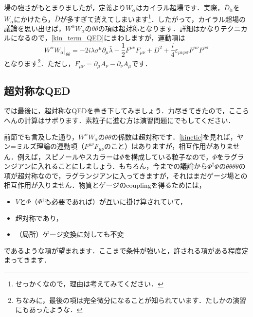 \documentclass[a4paper,uplatex,dvipdfmx]{jsarticle}
\theoremstyle{definition}
\begin{document}
場の強さがもとまりましたが，定義より$W_{\alpha}$はカイラル超場です．実際，$\bar{D}_{\dot{\alpha}}$を$W_{\alpha}$にかけたら，$\bar{D}$が多すぎて消えてしまいます\footnote{せっかくなので，理由は考えてみてください．}．したがって，カイラル超場の議論を思い出せば，$W^{\alpha}W_{\alpha}$の$\theta\theta$の項は超対称となります．詳細はかなりテクニカルになるので，\ref{kin_term_QED}にまわしますが，運動項は
\begin{equation}
  \left.
    W^{\alpha}W_{\alpha}
  \right|_{\theta\theta}
  =
  -
  2i\lambda\sigma^{\mu}\partial_{\mu}\bar{\lambda}
  -
  \frac{1}{2}F^{\mu\nu}F_{\mu\nu}
  +
  D^2
  +
  \frac{i}{4}\varepsilon_{\mu\nu\rho\sigma}F^{\mu\nu}F^{\rho\sigma}
  \label{kinetic}
\end{equation}
となります\footnote{ちなみに，最後の項は完全微分になることが知られています．たしか\cite{九後_ゲー_1989}の演習にもあったような．}．ただし，$F_{\mu\nu}=\partial_{\mu}A_{\nu}-\partial_{\nu}A_{\mu}$です．


\subsection{超対称なQED}

では最後に，超対称なQEDを書き下してみましょう．力尽きてきたので，ここらへんの計算はサボります．素粒子に進む方は演習問題にでもしてください．

前節でも言及した通り，$W^{\alpha}W_{\alpha}$の$\theta\theta$の係数は超対称です．\eqref{kinetic}を見れば，ヤン=ミルズ理論の運動項（$F^{\mu\nu}F_{\mu\nu}$のこと）はありますが，相互作用がありません．例えば，スピノールやスカラーは$\Phi$を構成している粒子なので，$\Phi$をラグランジアンに入れることにしましょう．もちろん，今までの議論から$\Phi^{\dag}\Phi$の$\theta\theta\overline{\theta\theta}$の項が超対称なので，ラグランジアンに入ってきますが，それはまだゲージ場との相互作用が入りません．物質とゲージのcouplingを得るためには，
\begin{itemize}
  \item 
  $V$と$\Phi$（$\Phi^{\dag}$も必要であれば）が互いに掛け算されていて，
  \item 
  超対称であり，
  \item 
  （局所）ゲージ変換に対しても不変
\end{itemize}
であるような項が望まれます．ここまで条件が強いと，許される項がある程度定まってきます．
\end{document}
